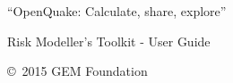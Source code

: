%
%
%
%









\begingroup
\thispagestyle{empty}
\par\normalfont\fontsize{15}{15}\sffamily\selectfont
``OpenQuake: Calculate, share, explore''
\centering
\vspace*{9cm}
\par\normalfont\fontsize{35}{35}\sffamily\selectfont
Risk Modeller's Toolkit - User Guide\par %
\endgroup


\newpage
\vfill
\thispagestyle{empty}

\noindent \copyright\ 2015 GEM Foundation\\ %


